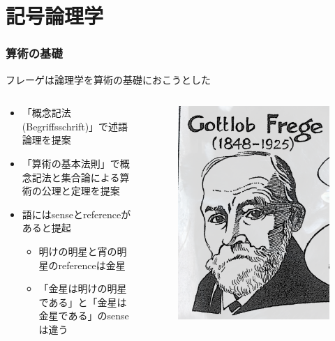 \documentclass[unicode, 14pt, aspectratio=169]{beamer}
\begin{document}
\section{記号論理学}
\begin{frame}
  \frametitle{算術の基礎}
  {\large フレーゲは論理学を算術の基礎におこうとした}
  \begin{columns}
    \begin{column}{0.8\textwidth}
      \begin{itemize}
      \item 「概念記法(Begriffsschrift)」で述語論理を提案
      \item 「算術の基本法則」で概念記法と集合論による算術の公理と定理を提案
      \item 語にはsenseとreferenceがあると提起
        \begin{itemize}
        \item 明けの明星と宵の明星のreferenceは金星
        \item 「金星は明けの明星である」と「金星は金星である」のsenseは違う
        \end{itemize}
      \end{itemize}
    \end{column}    
    \begin{column}{0.2\textwidth}
      \begin{figure}
        \includegraphics[width=1\textwidth]{images/frege.png}

\end{figure}
\end{column}
\end{columns}
\end{frame}
\end{document}
